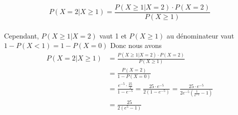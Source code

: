 \begin{exo}
\begin{subexo}
    \[
      P(X=2 | X\ge 1) = \frac{P(X\ge 1 | X=2) \cdot P(X=2)}{P(X\ge 1)}
    \]
    \\

    Cependant, $P(X\ge 1 | X=2)$ vaut 1 et $P(X\ge 1)$ au dénominateur vaut $1-P(X < 1) = 1-P(X=0)$
    Donc nous avons 
    \begin{align}
      P(X=2 | X\ge 1) &= \frac{P(X\ge 1 | X=2) \cdot P(X=2)}{P(X\ge 1)}\\
      &= \frac{P(X=2)}{1- P(X=0)}\\
      &= \frac{e^{-5}\cdot \frac{25}{2}}{1-e^{-5}} = \frac{25\cdot e^{-5}}{2(1-e^{-5})}
      = \frac{25\cdot e^{-5}}{2e^{-5}(\frac{1}{e^{-5}} -1)}\\
      &= \frac{25}{2(e^{5}-1)}
    \end{align}
  \end{subexo}
\end{exo}
